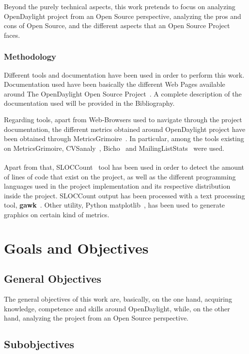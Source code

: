 \documentclass[a4paper, 12pt]{book}
\begin{document}
Beyond the purely technical aspects, this work pretends to focus on analyzing OpenDaylight project from an Open Source perspective, analyzing the pros and cons of Open Source, and the different aspects that an Open Source Project faces.

\subsection{Methodology}
\label{subsec:methodology}
Different tools and documentation have been used in order to perform this work. Documentation used have been basically the different Web Pages available around The OpenDaylight Open Source Project~\cite{OpenDaylight}. A complete description of the documentation used will be provided in the Bibliography.

Regarding tools, apart from Web-Browsers used to navigate through the project documentation, the different metrics obtained around OpenDaylight project have been obtained through MetricsGrimoire~\cite{MetricsGrimoire}. In particular, among the tools existing on MetricsGrimoire, CVSanaly~\cite{CVSanaly}, Bicho~\cite{Bicho} and MailingListStats~\cite{MailStats} were used.\\
\\
Apart from that, SLOCCount~\cite{SLOCCount} tool has been used in order to detect the amount of lines of code that exist on the project, as well as the different programming languages used in the project implementation and its respective distribution inside the project. SLOCCount output has been processed with a text processing tool, \textbf{gawk}~\cite{GAWK}. Other utility, Python matplotlib~\cite{PyMatplotlib}, has been used to generate graphics on certain kind of metrics.

\chapter{Goals and Objectives}
\label{chap:Goals}
\section{General Objectives}
\label{sec:genobj}

The general objectives of this work are, basically, on the one hand, acquiring knowledge, competence and skills around OpenDaylight, while, on the other hand, analyzing the project from an Open Source perspective.

\section{Subobjectives}
\label{sec:subobj}
\end{document}
